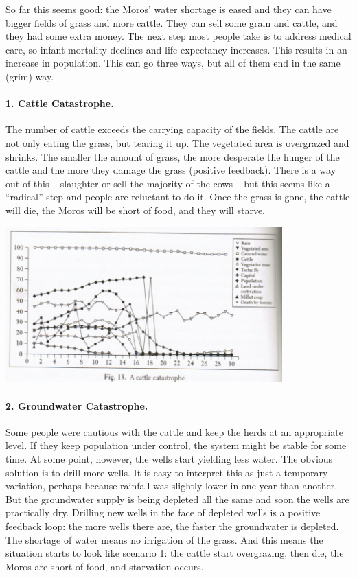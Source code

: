 So far this seems good: the Moros' water shortage is eased and they can have bigger fields of grass and more cattle. They can sell some grain and cattle, and they had some extra money. The next step most people take is to address medical care, so infant mortality declines and life expectancy increases. This results in an increase in population. This can go three ways, but all of them end in the same (grim) way.

\paragraph{1. Cattle Catastrophe.} The number of cattle exceeds the carrying capacity of the fields. The cattle are not only eating the grass, but tearing it up. The vegetated area is overgrazed and shrinks. The smaller the amount of grass, the more desperate the hunger of the cattle and the more they damage the grass (positive feedback). There is a way out of this -- slaughter or sell the majority of the cows -- but this seems like a ``radical'' step and people are reluctant to do it. Once the grass is gone, the cattle will die, the Moros will be short of food, and they will starve.

\begin{center}
	\includegraphics[width=0.8\textwidth]{images/cattlecatastrophe.png}
\end{center}

\paragraph{2. Groundwater Catastrophe.}
Some people were cautious with the cattle and keep the herds at an appropriate level. If they keep population under control, the system might be stable for some time. At some point, however, the wells start yielding less water. The obvious solution is to drill more wells. It is easy to interpret this as just a temporary variation, perhaps because rainfall was slightly lower in one year than another. But the groundwater supply is being depleted all the same and soon the wells are practically dry. Drilling new wells in the face of depleted wells is a positive feedback loop: the more wells there are, the faster the groundwater is depleted. The shortage of water means no irrigation of the grass. And this means the situation starts to look like scenario 1: the cattle start overgrazing, then die, the Moros are short of food, and starvation occurs.

